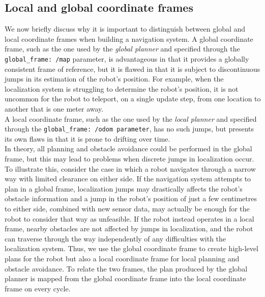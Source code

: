 \subsection{Local and global coordinate frames}
We now briefly discuss why it is important to distinguish between global
and local coordinate frames when building a navigation system. A global
coordinate frame, such as the one used by the \textit{global planner} and specified
through the \texttt{global\_frame: /map} parameter, is advantageous in that it
provides a globally consistent frame of reference, but it is flawed in that it is
subject to discontinuous jumps in its estimation of the robot’s position. For
example, when the localization system is struggling to determine the robot’s
position, it is not uncommon for the robot to teleport, on a single update
step, from one location to another that is one meter away.
\\
A local coordinate frame, such as the one used by the \textit{local planner} and
specified through the \texttt{global\_frame: /odom parameter}, has no such jumps,
but presents its own flaws in that it is prone to drifting over time.
\\
In theory, all planning and obstacle avoidance could be performed in
the global frame, but this may lead to problems when discrete jumps in
localization occur. To illustrate this, consider the case in which a robot
navigates through a narrow way with limited clearance on either side. If the
navigation system attempts to plan in a global frame, localization jumps
may drastically affects the robot’s obstacle information and a jump in the
robot’s position of just a few centimetres to either side, combined with new
sensor data, may actually be enough for the robot to consider that way as
unfeasible. If the robot instead operates in a local frame, nearby obstacles
are not affected by jumps in localization, and the robot can traverse through
the way independently of any difficulties with the localization system.
Thus, we use the global coordinate frame to create high-level plans for
the robot but also a local coordinate frame for local planning and obstacle
avoidance. To relate the two frames, the plan produced by the global planner
is mapped from the global coordinate frame into the local coordinate frame
on every cycle.

